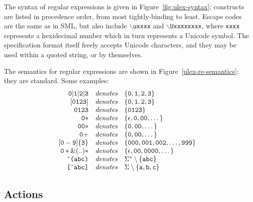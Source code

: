The syntax of regular expressions is given in Figure~\ref{fig:ulex-syntax}; constructs are listed in precedence order, from most tightly-binding to least.  Escape codes are the same as in SML, but also include \texttt{$\backslash$uxxxx} and \texttt{$\backslash$Uxxxxxxxx}, where \texttt{xxxx} represents a hexidecimal number which in turn represents a Unicode symbol.  The specification format itself freely accepts Unicode characters, and they may be used within a quoted string, or by themselves.

The semantics for \ulex{} regular expressions are shown in Figure~\ref{ulex-re-semantics}; they are standard.  Some examples:
\[
\begin{array}{rcl}
{\tt 0 | 1 | 2 | 3}	& \textit{denotes} &
    \{ \texttt{0}, \texttt{1}, \texttt{2}, \texttt{3} \}	\\
{\tt [0123]}	& \textit{denotes} &
    \{ \texttt{0}, \texttt{1}, \texttt{2}, \texttt{3} \}	\\
{\tt 0123}	& \textit{denotes} &
    \{ \texttt{0123} \}						\\
{\tt 0*}	& \textit{denotes} &
    \{ \epsilon, \texttt{0}, \texttt{00}, \dots \}		\\
{\tt 00*}	& \textit{denotes} &
    \{ \texttt{0}, \texttt{00}, \dots \}		\\
{\tt 0+}	& \textit{denotes} &
    \{ \texttt{0}, \texttt{00}, \dots \}		\\
{\tt [0-9]\{3\}}	& \textit{denotes} &
    \{ \texttt{000}, \texttt{001}, \texttt{002}, \dots, \texttt{999} \}	\\
{\tt 0* \& (..)*}	& \textit{denotes} &
    \{ \epsilon, \texttt{00}, \texttt{0000}, \dots \}	\\
\texttt{\^{ }(abc)}	& \textit{denotes} &
    \Sigma^* \setminus \{ \texttt{abc} \}	\\
\texttt{[\^{ }abc]}	& \textit{denotes} &
    \Sigma \setminus \{ \texttt{a}, \texttt{b}, \texttt{c} \}
\end{array}
\]

\subsection{Actions}\label{sec:ulex-actions}

